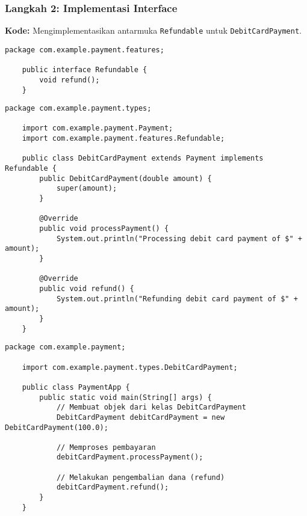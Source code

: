 \subsubsection{Langkah 2: Implementasi Interface}

\textbf{Kode:} Mengimplementasikan antarmuka \texttt{Refundable} untuk \texttt{DebitCardPayment}.

\begin{lstlisting}[style=JavaStyle, caption={Refundable.java}]
	package com.example.payment.features;
	
	public interface Refundable {
		void refund();
	}
\end{lstlisting}

\begin{lstlisting}[style=JavaStyle, caption={DebitCardPayment.java}]
	package com.example.payment.types;
	
	import com.example.payment.Payment;
	import com.example.payment.features.Refundable;
	
	public class DebitCardPayment extends Payment implements Refundable {
		public DebitCardPayment(double amount) {
			super(amount);
		}
		
		@Override
		public void processPayment() {
			System.out.println("Processing debit card payment of $" + amount);
		}
		
		@Override
		public void refund() {
			System.out.println("Refunding debit card payment of $" + amount);
		}
	}
\end{lstlisting}

\begin{lstlisting}[style=JavaStyle, caption={PaymentApp.java}]
	package com.example.payment;
	
	import com.example.payment.types.DebitCardPayment;
	
	public class PaymentApp {
		public static void main(String[] args) {
			// Membuat objek dari kelas DebitCardPayment
			DebitCardPayment debitCardPayment = new DebitCardPayment(100.0);
			
			// Memproses pembayaran
			debitCardPayment.processPayment();
			
			// Melakukan pengembalian dana (refund)
			debitCardPayment.refund();
		}
	}
\end{lstlisting}

